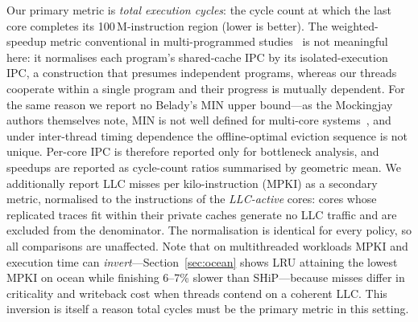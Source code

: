 \documentclass[conference]{IEEEtran}
\begin{document}
\begin{table}[htbp]
    \centering
    \renewcommand{\arraystretch}{1.2}
    \caption{Reimplemented baseline configurations}
    \label{tab:baselines}
\end{table}

Our primary metric is \emph{total execution cycles}: the cycle count at which the last core completes its 100\,M-instruction region (lower is better). The weighted-speedup metric conventional in multi-programmed studies~\cite{shah2022mockingjay} is not meaningful here: it normalises each program's shared-cache IPC by its isolated-execution IPC, a construction that presumes independent programs, whereas our threads cooperate within a single program and their progress is mutually dependent. For the same reason we report no Belady's MIN upper bound---as the Mockingjay authors themselves note, MIN is not well defined for multi-core systems~\cite{shah2022mockingjay}, and under inter-thread timing dependence the offline-optimal eviction sequence is not unique. Per-core IPC is therefore reported only for bottleneck analysis, and speedups are reported as cycle-count ratios summarised by geometric mean. We additionally report LLC misses per kilo-instruction (MPKI) as a secondary metric, normalised to the instructions of the \emph{LLC-active} cores: cores whose replicated traces fit within their private caches generate no LLC traffic and are excluded from the denominator. The normalisation is identical for every policy, so all comparisons are unaffected. Note that on multithreaded workloads MPKI and execution time can \emph{invert}---Section~\ref{sec:ocean} shows LRU attaining the lowest MPKI on ocean while finishing 6--7\% slower than SHiP---because misses differ in criticality and writeback cost when threads contend on a coherent LLC. This inversion is itself a reason total cycles must be the primary metric in this setting.
\end{document}
